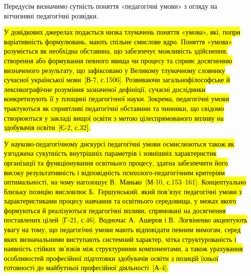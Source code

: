 Передусім визначимо сутність поняття «педагогічні умови» з огляду на вітчизняні педагогічні розвідки.

\hl{У довідкових джерелах подається низка тлумачень поняття «умова», які, попри варіативність формулювань, мають спільне смислове ядро. Поняття «умова» розуміється як необхідна обставина, що забезпечує можливість здійснення, створення або формування певного явища чи процесу та сприяє досягненню визначеного результату, що зафіксовано у Великому тлумачному словнику сучасної української мови~{[}В-7, с.1506{]}. Розвиваючи загальнофілософське й лексикографічне розуміння зазначеної дефініції, сучасні дослідники конкретизують її у площині педагогічної науки. Зокрема, педагогічні умови трактуються як сприятливі педагогічні обставини та чинники, що свідомо створюються у закладі вищої освіти з метою цілеспрямованого впливу на здобувачів освіти~{[}Є-2, с.32{]}.}

\hl{У науково-педагогічному дискурсі педагогічні умови осмислюються також як узгоджена сукупність внутрішніх параметрів і зовнішніх характеристик організації та функціонування освітнього процесу, здатна забезпечити його високу результативність і відповідність психолого-педагогічним критеріям оптимальності, на чому наголошує В.~Манько~{[}М-10, с.153--161{]}. Концептуально близьку позицію висловлює Б.~Гершунський, який пов'язує педагогічні умови з характеристиками процесу навчання та освітнього середовища, у межах якого формуються й реалізуються педагогічні впливи, спрямовані на досягнення поставлених цілей~{[}Г-21, с.46{]}. Водночас А.~Ашеров і В.~Логвіненко акцентують увагу на тому, що педагогічні умови мають відповідати певним вимогам, серед яких визначальними виступають системний характер, чітка структурованість і наявність стійких зв'язків між структурними компонентами, а також урахування особливостей професійної підготовки здобувачів освіти з позицій їхньої готовності до майбутньої професійної діяльності~{[}А-4{]}.}

